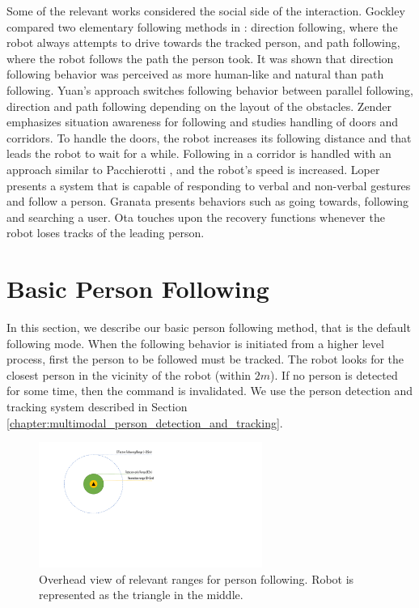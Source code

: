 Some of the relevant works considered the social side of the interaction. Gockley compared two elementary following methods in \cite{gockley2007natural}: direction following, where the robot always attempts to drive towards the tracked person, and path following, where the robot follows the path the person took. It was shown that direction following behavior was perceived as more human-like and natural than path following. Yuan's \cite{yuan2008spatial} approach switches following behavior between parallel following, direction and path following depending on the layout of the obstacles. Zender \cite{zender2007human} emphasizes situation awareness for following and studies handling of doors and corridors. To handle the doors, the robot increases its following distance and that leads the robot to wait for a while. Following in a corridor is handled with an approach similar to Pacchierotti \cite{pacchierotti2005human}, and the robot's speed is increased. Loper \cite{loper2009mobile} presents a system that is capable of responding to verbal and non-verbal gestures and follow a person. Granata \cite{granata2012framework} presents behaviors such as going towards, following and searching a user. Ota \cite{ota2013recovery} touches upon the recovery functions whenever the robot loses tracks of the leading person.

\section{Basic Person Following}
\label{sec:following_basic_person_following}

In this section, we describe our basic person following method, that is the default following mode. When the following behavior is initiated from a higher level process, first the person to be followed must be tracked. The robot looks for the closest person in the vicinity of the robot (within $2m$). If no person is detected for some time, then the command is invalidated. We use the person detection and tracking system described in Section \ref{chapter:multimodal_person_detection_and_tracking}.

\begin{figure}[ht!]
\hspace*{4cm} 
\includegraphics[width=0.65\textwidth]{pics/following_ranges_cropped}
\caption{Overhead view of relevant ranges for person following. Robot is represented as the triangle in the middle.}
\label{fig:following_ranges}
\end{figure}

